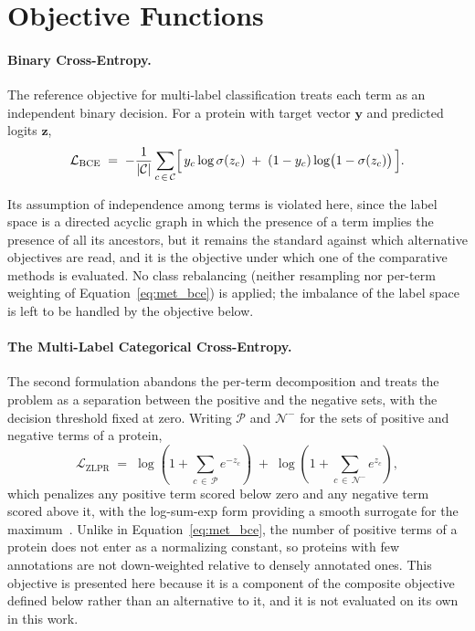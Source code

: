 \documentclass[Ingles]{ic-tese-v3}
\begin{document}
\section{Objective Functions}
\label{sec:met_loss}

\paragraph{Binary Cross-Entropy.} The reference objective for multi-label classification treats each
term as an independent binary decision. For a protein with target vector $\mathbf{y}$ and predicted
logits $\mathbf{z}$,
\begin{equation}
  \mathcal{L}_{\text{BCE}} \;=\; -\frac{1}{|\mathcal{C}|}
  \sum_{c \,\in\, \mathcal{C}}
  \Bigl[\, y_c \log \sigma(z_c) \;+\; (1 - y_c)\log\bigl(1 - \sigma(z_c)\bigr) \,\Bigr].
  \label{eq:met_bce}
\end{equation}

Its assumption of independence among terms is violated here, since the label space is a
directed acyclic graph in which the presence of a term implies the presence of all its ancestors,
but it remains the standard against which alternative objectives are read, and it is the objective
under which one of the comparative methods is evaluated. No class rebalancing (neither resampling
nor per-term weighting of Equation~\eqref{eq:met_bce}) is applied; the imbalance of the label
space is left to be handled by the objective below.

\paragraph{The Multi-Label Categorical Cross-Entropy.} The second formulation abandons the per-term
decomposition and treats the problem as a separation between the positive and the negative sets,
with the decision threshold fixed at zero. Writing $\mathcal{P}$ and $\mathcal{N}^{-}$ for the sets of
positive and negative terms of a protein,
\begin{equation}
  \mathcal{L}_{\text{ZLPR}} \;=\;
  \log\!\left(1 + \sum_{c \,\in\, \mathcal{P}} e^{-z_c}\right)
  \;+\;
  \log\!\left(1 + \sum_{c \,\in\, \mathcal{N}^{-}} e^{z_c}\right),
  \label{eq:met_zlpr}
\end{equation}
\noindent which penalizes any positive term scored below zero and any negative term scored above it, with the
log-sum-exp form providing a smooth surrogate for the maximum~\cite{su2022zlpr}. Unlike in
Equation~\eqref{eq:met_bce}, the number of positive terms of a protein does not enter as a
normalizing constant, so proteins with few annotations are not down-weighted relative to
densely annotated ones. This objective is presented here because it is a component of the composite
objective defined below rather than an alternative to it, and it is not evaluated on its own in this
work.
\end{document}
